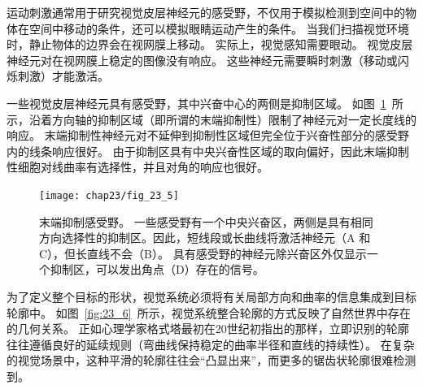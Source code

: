 运动刺激通常用于研究视觉皮层神经元的感受野，不仅用于模拟检测到空间中的物体在空间中移动的条件，还可以模拟眼睛运动产生的条件。
当我们扫描视觉环境时，静止物体的边界会在视网膜上移动。
实际上，视觉感知需要眼动。
视觉皮层神经元对在视网膜上稳定的图像没有响应。
这些神经元需要瞬时刺激（移动或闪烁刺激）才能激活。


一些视觉皮层神经元具有感受野，其中兴奋中心的两侧是抑制区域。
如图~\ref{fig:23_5}~所示，沿着方向轴的抑制区域（即所谓的末端抑制性）限制了神经元对一定长度线的响应。
末端抑制性神经元对不延伸到抑制性区域但完全位于兴奋性部分的感受野内的线条响应很好。
由于抑制区具有中央兴奋性区域的取向偏好，因此末端抑制性细胞对线曲率有选择性，并且对角的响应也很好。


\begin{figure}[htbp]
	\centering
	\texttt{[image: chap23/fig\_23\_5]}
	\caption{末端抑制感受野。
		一些感受野有一个中央兴奋区，两侧是具有相同方向选择性的抑制区。因此，短线段或长曲线将激活神经元（A 和 C），但长直线不会（B）。
		具有感受野的神经元除兴奋区外仅显示一个抑制区，可以发出角点（D）存在的信号。}
	\label{fig:23_5}
\end{figure}


为了定义整个目标的形状，视觉系统必须将有关局部方向和曲率的信息集成到目标轮廓中。
如图~\ref{fig:23_6}~所示，视觉系统整合轮廓的方式反映了自然世界中存在的几何关系。
正如心理学家格式塔最初在20世纪初指出的那样，立即识别的轮廓往往遵循良好的延续规则（弯曲线保持稳定的曲率半径和直线的持续性）。
在复杂的视觉场景中，这种平滑的轮廓往往会“凸显出来”，而更多的锯齿状轮廓很难检测到。


